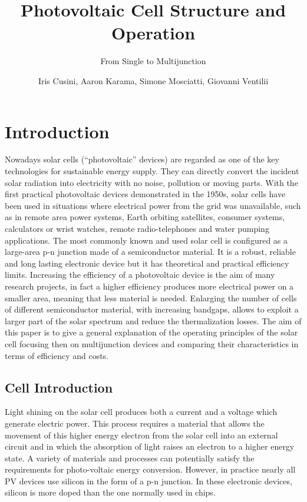 \documentclass[11pt]{article} %
\title{Photovoltaic Cell Structure and Operation}
\subtitle{From Single to Multijunction}
\author{Iris Cusini, Aaron Karama, Simone Mosciatti, Giovanni Ventilii}
\begin{document}
\maketitle

\section{Introduction}

Nowadays solar cells (``photovoltaic'' devices) are regarded as one of the key technologies for sustainable energy supply. They can directly convert the incident solar radiation into electricity with no noise, pollution or moving parts. With the first practical photovoltaic devices demonstrated in the 1950s, solar cells have been used in situations where electrical power from the grid was unavailable, such as in remote area power systems, Earth orbiting satellites, consumer systems, calculators or wrist watches, remote radio-telephones and water pumping applications. The most commonly known and used solar cell is configured as a large-area p-n junction made of a semiconductor material. It is a robust, reliable and long lasting electronic device but it has theoretical and practical efficiency limits. Increasing the efficiency of a photovoltaic device is the aim of  many  research  projects, in fact a higher efficiency produces more electrical power on a smaller area, meaning that  less material is needed. Enlarging the number of cells of different semiconductor material, with increasing bandgaps, allows to exploit a larger part of the solar spectrum and reduce the thermalization losses. The aim of this paper is to give a general explanation of the operating principles of the solar cell focusing then on multijunction devices and comparing their characteristics in terms of efficiency and costs.

\subsection{Cell Introduction}

Light shining on the solar cell produces both a current and a voltage which generate electric power. This process requires a material that allows the movement of this higher energy electron from the solar cell into an external circuit and in which  the absorption of light raises an electron to a higher energy state. A variety of materials and processes can potentially satisfy the requirements for photo-voltaic energy conversion. However, in practice nearly all PV devices use silicon in the form of a p-n junction. In these electronic devices, silicon is more doped than the one normally used in chips.
\end{document}
